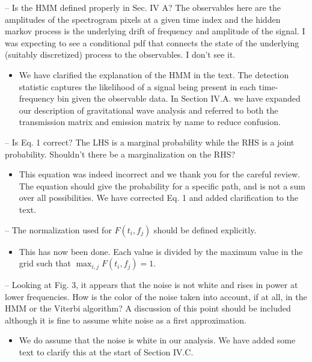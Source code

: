\documentclass{article}
\begin{document}
\noindent
-- Is the HMM defined properly in Sec. IV A? The observables here are the amplitudes of the spectrogram pixels at a given time index and the hidden markov process is the underlying drift of frequency and amplitude of the signal. I was expecting to see a conditional pdf that connects the state of the underlying (suitably discretized) process to the observables. I don't see it.
\begin{itemize}
\item We have clarified the explanation of the HMM in the text. The detection statistic captures the likelihood of a signal being present in each time-frequency bin given the observable data. In Section IV.A. we have expanded our description of gravitational wave analysis and referred to both the transmission matrix and emission matrix by name to reduce confusion. 
\end{itemize}

\noindent
-- Is Eq. 1 correct? The LHS is a marginal probability while the RHS is a joint probability. Shouldn't there be a marginalization on the RHS?
\begin{itemize}
\item This equation was indeed incorrect and we thank you for the careful review. The equation should give the probability for a specific path, and is not a sum over all possibilities. We have corrected Eq. 1 and added clarification to the text. 
\end{itemize}

\noindent
-- The normalization used for $F(t_i, f_j)$ should be defined explicitly. 
\begin{itemize}
\item This has now been done. Each value is divided by the maximum value in the grid such that $\max_{i,j} F(t_i, f_j) = 1$.
\end{itemize}

\noindent
-- Looking at Fig. 3, it appears that the noise is not white and rises in power at lower frequencies. How is the color of the noise taken into account, if at all, in the HMM or the Viterbi algorithm? A discussion of this point should be included although it is fine to assume white noise as a first approximation. 
\begin{itemize}
\item We do assume that the noise is white in our analysis. We have added some text to clarify this at the start of Section IV.C.
\end{itemize}
\end{document}

